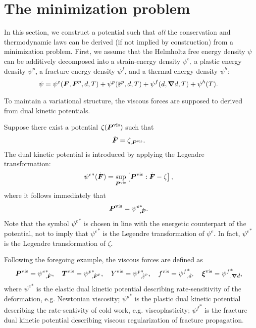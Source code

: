 \section{The minimization problem}
\label{section: framework/minimization}

In this section, we construct a potential such that \emph{all} the conservation and thermodynamic laws can be derived (if not implied by construction) from a minimization problem. First, we assume that the Helmholtz free energy density $\psi$ can be additively decomposed into a strain-energy density $\psi^e$, a plastic energy density $\psi^p$, a fracture energy density $\psi^f$, and a thermal energy density $\psi^h$:
\begin{align}
  \psi = \psi^e(\defgrad, \defgrad^p, d, T) + \psi^p(\ep, d, T) + \psi^f(d, \grad d, T) + \psi^h(T). \label{eq: energies}
\end{align}

To maintain a variational structure, the viscous forces are supposed to derived from dual kinetic potentials.

\begin{example}
  \vspace{-0.5em}
  Suppose there exist a potential $\zeta(\boldsymbol{P}^\text{vis})$ such that
  \begin{align}
    \dot{\boldsymbol{F}} = \zeta_{,\boldsymbol{P}^\text{vis}}.
  \end{align}
  The dual kinetic potential is introduced by applying the Legendre transformation:
  \begin{align}
    {\psi^e}^*(\dot{\boldsymbol{F}}) = \sup_{\boldsymbol{P}^\text{vis}}\left[ \boldsymbol{P}^\text{vis}:\dot{\boldsymbol{F}} - \zeta \right],
  \end{align}
  where it follows immediately that
  \begin{align}
    \boldsymbol{P}^\text{vis} = {\psi^e}^*_{,\dot{\boldsymbol{F}}}.
  \end{align}
  Note that the symbol ${\psi^e}^*$ is chosen in line with the energetic counterpart of the potential, not to imply that ${\psi^e}^*$ is the Legendre transformation of $\psi^e$. In fact, ${\psi^e}^*$ is the Legendre transformation of $\zeta$.
\end{example}

Following the foregoing example, the viscous forces are defined as
\begin{align}
  \bfP^\text{vis} = {\psi^e}^*_{,\dot{\defgrad}}, \quad \bfT^\text{vis} = {\psi^p}^*_{,\dot{\defgrad}^p}, \quad Y^\text{vis} = {\psi^p}^*_{,\epdot}, \quad f^\text{vis} = {\psi^f}^*_{,\dot{d}}, \quad \bs{\xi}^\text{vis} = {\psi^f}^*_{,\grad\dot{d}},
\end{align}
where ${\psi^e}^*$ is the elastic dual kinetic potential describing rate-sensitivity of the deformation, e.g. Newtonian viscosity; ${\psi^p}^*$ is the plastic dual kinetic potential describing the rate-sentivity of cold work, e.g. viscoplasticity; ${\psi^f}^*$ is the fracture dual kinetic potential describing viscous regularization of fracture propagation.

